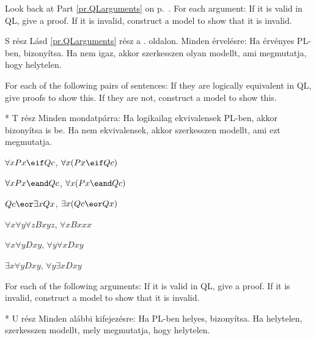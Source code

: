 \problempart
Look back at Part \ref{pr.QLarguments} on p.~\pageref{pr.QLarguments}. For each argument: If it is valid in QL, give a proof. If it is invalid, construct a model to show that it is invalid.

S rész Lásd \ref{pr.QLarguments} rész a \pageref{pr.QLarguments}. oldalon. Minden érvelésre: Ha érvényes PL-ben, bizonyítsa. Ha nem igaz, akkor szerkesszen olyan modellt, ami megmutatja, hogy helytelen.

\solutions
\problempart
\label{pr.QLequivornot}
For each of the following pairs of sentences: If they are logically equivalent in QL, give proofs to show this. If they are not, construct a model to show this.

* T rész  Minden mondatpárra: Ha logikailag ekvivalensek PL-ben, akkor bizonyítsa is be. Ha nem ekvivalensek, akkor szerkesszen modellt, ami ezt megmutatja.

\begin{earg}
\item $\forall x Px \eif Qc$, $\forall x (Px \eif Qc)$
\item $\forall x Px \eand Qc$, $\forall x (Px \eand Qc)$
\item $Qc \eor \exists x Qx$, $\exists x (Qc \eor Qx)$
\item $\forall x\forall y \forall z Bxyz$, $\forall x Bxxx$
\item $\forall x\forall y Dxy$, $\forall y\forall x Dxy$
\item $\exists x\forall y Dxy$, $\forall y\exists x Dxy$
\end{earg}

\solutions
\problempart
\label{pr.QLvalidornot}
For each of the following arguments: If it is valid in QL, give a proof. If it is invalid, construct a model to show that it is invalid.

* U rész Minden alábbi kifejezésre: Ha PL-ben helyes, bizonyítsa. Ha helytelen, szerkesszen modellt, mely megmutatja, hogy helytelen.

